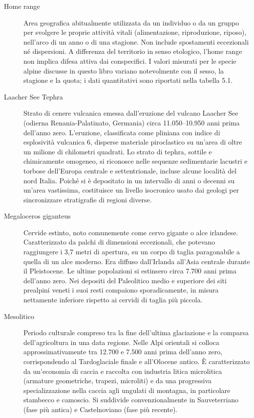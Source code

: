 \begin{description}
\item[Home range] Area geografica abitualmente utilizzata da un individuo o da un gruppo per svolgere le proprie attività vitali (alimentazione, riproduzione, riposo), nell'arco di un anno o di una stagione. Non include spostamenti eccezionali né dispersioni. A differenza del territorio in senso etologico, l'home range non implica difesa attiva dai conspecifici. I valori misurati per le specie alpine discusse in questo libro variano notevolmente con il sesso, la stagione e la quota; i dati quantitativi sono riportati nella tabella 5.1.

\item[Laacher See Tephra] Strato di cenere vulcanica emessa dall'eruzione del vulcano Laacher See (odierna Renania-Palatinato, Germania) circa 11.050--10.950 anni prima dell'anno zero. L'eruzione, classificata come pliniana con indice di esplosività vulcanica 6, disperse materiale piroclastico su un'area di oltre un milione di chilometri quadrati. Lo strato di tephra, sottile e chimicamente omogeneo, si riconosce nelle sequenze sedimentarie lacustri e torbose dell'Europa centrale e settentrionale, incluse alcune località del nord Italia. Poiché si è depositato in un intervallo di anni o decenni su un'area vastissima, costituisce un livello isocronico usato dai geologi per sincronizzare stratigrafie di regioni diverse.

\item[Megaloceros giganteus] Cervide estinto, noto comunemente come cervo gigante o alce irlandese. Caratterizzato da palchi di dimensioni eccezionali, che potevano raggiungere i 3,7 metri di apertura, su un corpo di taglia paragonabile a quella di un alce moderno. Era diffuso dall'Irlanda all'Asia centrale durante il Pleistocene. Le ultime popolazioni si estinsero circa 7.700 anni prima dell'anno zero. Nei depositi del Paleolitico medio e superiore dei siti prealpini veneti i suoi resti compaiono sporadicamente, in misura nettamente inferiore rispetto ai cervidi di taglia più piccola.

\item[Mesolitico] Periodo culturale compreso tra la fine dell'ultima glaciazione e la comparsa dell'agricoltura in una data regione. Nelle Alpi orientali si colloca approssimativamente tra 12.700 e 7.500 anni prima dell'anno zero, corrispondendo al Tardoglaciale finale e all'Olocene antico. È caratterizzato da un'economia di caccia e raccolta con industria litica microlitica (armature geometriche, trapezi, microliti) e da una progressiva specializzazione nella caccia agli ungulati di montagna, in particolare stambecco e camoscio. Si suddivide convenzionalmente in Sauveterriano (fase più antica) e Castelnoviano (fase più recente).


\end{description}
